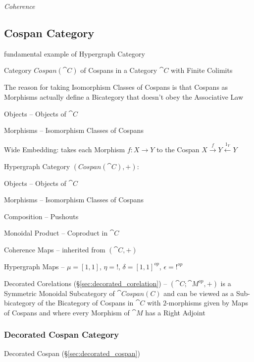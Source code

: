 \emph{Coherence}



\subsection{Cospan Category}\label{sec:cospan_category}

fundamental example of Hypergraph Category

Category $Cospan(\cat{C})$ of Cospans in a Category $\cat{C}$ with
Finite Colimits

\fist The reason for taking Isomorphism Classes of Cospans is that
Cospans as Morphisms actually define a Bicategory that doesn't obey
the Associative Law %

Objects -- Objects of $\cat{C}$

Morphisms -- Isomorphism Classes of Cospans

Wide Embedding: takes each Morphism $f : X \rightarrow Y$ to the
Cospan $X \xrightarrow{f} Y \xleftarrow{1_Y} Y$

Hypergraph Category $(Cospan(\cat{C}), +)$:

Objects -- Objects of $\cat{C}$

Morphisms -- Isomorphism Classes of Cospans

Composition -- Pushouts

Monoidal Product -- Coproduct in $\cat{C}$

Coherence Maps -- inherited from $(\cat{C}, +)$

Hypergraph Maps -- $\mu = [1,1]$, $\eta = !$, $\delta = [1,1]^{op}$,
$\epsilon = !^{op}$

Decorated Corelations (\S\ref{sec:decorated_corelation}) --
$(\cat{C};\cat{M}^{op}, +)$ is a Symmetric Monoidal Subcategory of
$\cat{Cospan(C)}$ and can be viewed as a Sub-bicategory of the
Bicategory of Cospans in $\cat{C}$ with $2$-morphisms given by Maps of
Cospans and where every Morphism of $\cat{M}$ has a Right Adjoint



\subsubsection{Decorated Cospan Category}
\label{sec:decorated_cospan_category}

Decorated Cospan (\S\ref{sec:decorated_cospan})

